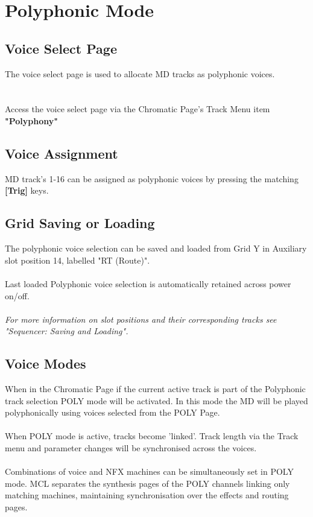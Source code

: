 \chapter{Polyphonic Mode}

\section{Voice Select Page}
The voice select page is used to allocate MD tracks as polyphonic voices.\\
\\\\
Access the voice select page via the Chromatic Page's Track Menu item \textbf{"Polyphony"}
\section{Voice Assignment}
MD track's 1-16 can be assigned as polyphonic voices by pressing the matching \textbf{[Trig]} keys.
\section{Grid Saving or Loading}
The polyphonic voice selection can be saved and loaded from Grid Y in Auxiliary slot position 14, labelled "RT (Route)". 
\\\\Last loaded Polyphonic voice selection is automatically retained across power on/off.
\\\\
\textit{For more information on slot positions and their corresponding tracks see  "Sequencer: Saving and Loading".}
\section{Voice Modes}

When in the Chromatic Page if the current active track is part of the Polyphonic track selection POLY mode will be activated. In this mode the MD will be played polyphonically using voices selected from the POLY Page.\\
\\
When POLY mode is active, tracks become 'linked'. Track length via the Track menu and parameter changes will be synchronised across the voices. 
\\\\
Combinations of voice and NFX machines can be simultaneously set in POLY mode.  MCL separates the synthesis pages of the POLY channels linking only matching machines, maintaining synchronisation over the effects and routing pages. 
\newpage

